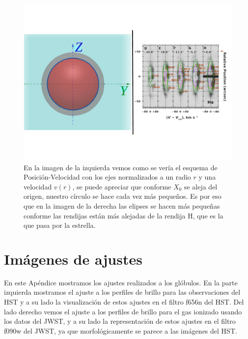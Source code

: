 \documentclass{book}
\begin{document}
\begin{figure}
    \centering
    \includegraphics[width=\textwidth]{imagenes_corregidas/PV 03.pdf}
    \caption{En la imagen de la izquierda vemos como se vería el esquema de Posición-Velocidad con los ejes normalizados a un radio $r$ y una velocidad $v(r)$, se puede apreciar que conforme $X_0$ se aleja del origen, nuestro círculo se hace cada vez más pequeños. Es por eso que en la imagen de la derecha las elipses se hacen más pequeñas conforme las rendijas están más alejadas de la rendija H, que es la que pasa por la estrella. }
    \label{fig: ap PV modelo}
\end{figure}


\chapter{Imágenes de ajustes}\label{App : ajustes}

En este Apéndice mostramos los ajustes realizados a los glóbulos. En
la parte izquierda mostramos el ajuste a los perfiles de brillo para
las observaciones del HST y a su lado la visualización de estos
ajustes en el filtro f656n del HST. Del lado derecho vemos el ajuste a
los perfiles de brillo para el gas ionizado usando los datos del JWST,
y a su lado la representación de estos ajustes en el filtro f090w del
JWST, ya que morfológicamente se parece a las imágenes del HST.
\end{document}
